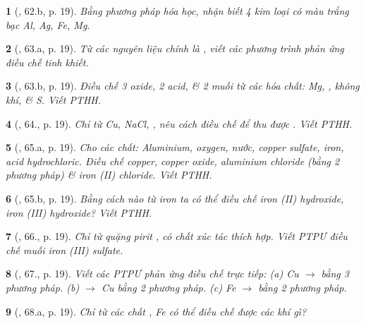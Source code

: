 \documentclass{article}
\newtheorem{baitoan}{}
\begin{document}
\begin{baitoan}[\cite{An_400_BT_Hoa_Hoc_9}, 62.b, p. 19]
	Bằng phương pháp hóa học, nhận biết 4 kim loại có màu trắng bạc {\rm Al, Ag, Fe, Mg}.
\end{baitoan}

\begin{baitoan}[\cite{An_400_BT_Hoa_Hoc_9}, 63.a, p. 19]
	Từ các nguyên liệu chính là {\rm{}}, viết các phương trình phản ứng điều chế {\rm{}} tinh khiết.
\end{baitoan}

\begin{baitoan}[\cite{An_400_BT_Hoa_Hoc_9}, 63.b, p. 19]
	Điều chế 3 oxide, 2 acid, \& 2 muối từ các hóa chất: {\rm Mg, }, không khí, \& {\rm S}. Viết {\rm PTHH}.
\end{baitoan}

\begin{baitoan}[\cite{An_400_BT_Hoa_Hoc_9}, 64., p. 19]
	Chỉ từ {\rm Cu, NaCl, }, nêu cách điều chế để thu được {\rm{}}. Viết {\rm PTHH}.
\end{baitoan}

\begin{baitoan}[\cite{An_400_BT_Hoa_Hoc_9}, 65.a, p. 19]
	Cho các chất: Aluminium, oxygen, nước, copper sulfate, iron, acid hydrochloric. Điều chế copper, copper oxide, aluminium chloride (bằng 2 phương pháp) \& iron ({\rm II}) chloride. Viết {\rm PTHH}.
\end{baitoan}

\begin{baitoan}[\cite{An_400_BT_Hoa_Hoc_9}, 65.b, p. 19]
	Bằng cách nào từ iron ta có thể điều chế iron ({\rm II}) hydroxide, iron ({\rm III}) hydroxide? Viết {\rm PTHH}.
\end{baitoan}

\begin{baitoan}[\cite{An_400_BT_Hoa_Hoc_9}, 66., p. 19]
	Chỉ từ quặng pirit {\rm{}}, có chất xúc tác thích hợp. Viết {\rm PTPƯ} điều chế muối iron ({\rm III}) sulfate.
\end{baitoan}

\begin{baitoan}[\cite{An_400_BT_Hoa_Hoc_9}, 67., p. 19]
	Viết các {\rm PTPƯ} phản ứng điều chế trực tiếp: (a) {\rm Cu $\to$  bằng 3 phương pháp}. (b) {\rm{} $\to$ Cu} bằng 2 phương pháp. (c) {\rm Fe $\to$ } bằng 2 phương pháp.
\end{baitoan}

\begin{baitoan}[\cite{An_400_BT_Hoa_Hoc_9}, 68.a, p. 19]
	Chỉ từ các chất {\rm{}, Fe} có thể điều chế được các khí gì?
\end{baitoan}
\end{document}
